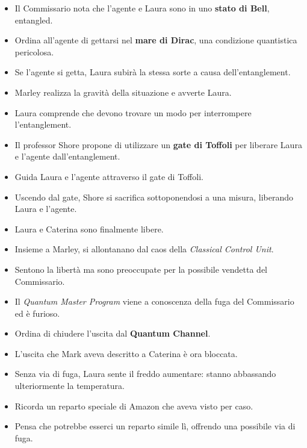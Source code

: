 \begin{itemize}
\begin{itemize}
    \item Il Commissario nota che l'agente e Laura sono in uno \textbf{stato di Bell}, entangled.
    \item Ordina all'agente di gettarsi nel \textbf{mare di Dirac}, una condizione quantistica pericolosa.
    \item Se l'agente si getta, Laura subirà la stessa sorte a causa dell'entanglement.
\end{itemize}


\begin{itemize}
    \item Marley realizza la gravità della situazione e avverte Laura.
    \item Laura comprende che devono trovare un modo per interrompere l'entanglement.
\end{itemize}


\begin{itemize}
    \item Il professor Shore propone di utilizzare un \textbf{gate di Toffoli} per liberare Laura e l'agente dall'entanglement.
    \item Guida Laura e l'agente attraverso il gate di Toffoli.
    \item Uscendo dal gate, Shore si sacrifica sottoponendosi a una misura, liberando Laura e l'agente.
\end{itemize}


\begin{itemize}
    \item Laura e Caterina sono finalmente libere.
    \item Insieme a Marley, si allontanano dal caos della \emph{Classical Control Unit}.
    \item Sentono la libertà ma sono preoccupate per la possibile vendetta del Commissario.
\end{itemize}


\begin{itemize}
    \item Il \emph{Quantum Master Program} viene a conoscenza della fuga del Commissario ed è furioso.
    \item Ordina di chiudere l'uscita dal \textbf{Quantum Channel}.
    \item L'uscita che Mark aveva descritto a Caterina è ora bloccata.
\end{itemize}


\begin{itemize}
    \item Senza via di fuga, Laura sente il freddo aumentare: stanno abbassando ulteriormente la temperatura.
    \item Ricorda un reparto speciale di Amazon che aveva visto per caso.
    \item Pensa che potrebbe esserci un reparto simile lì, offrendo una possibile via di fuga.
\end{itemize}




\end{itemize}
